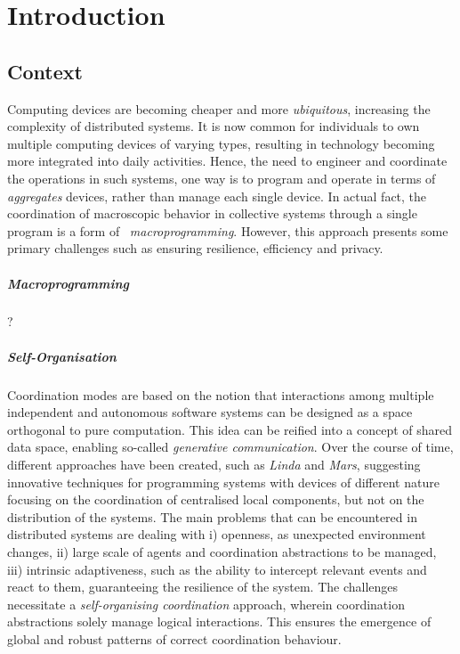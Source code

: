 
\chapter{Introduction}
\label{ch:introduction}
\section{Context}
\label{sec:context}

Computing devices are becoming cheaper and more \emph{ubiquitous}, increasing the complexity of distributed systems.
It is now common for individuals to own multiple computing devices of varying types,
resulting in technology becoming more integrated into daily activities.
Hence, the need to engineer and coordinate the operations in such systems, one way is to program and operate in terms of
    \emph{aggregates} devices, rather than manage each single device.
In actual fact, the coordination of macroscopic behavior in collective systems through a single program is a form of
~\emph{macroprogramming}.
However, this approach presents some primary challenges such as ensuring resilience, efficiency and privacy.

\paragraph{Macroprogramming}
?

\paragraph{Self-Organisation}
Coordination modes are based on the notion that interactions among multiple independent and autonomous software systems
can be designed as a space orthogonal to pure computation.
This idea can be reified into a concept of shared data space, enabling so-called \emph{generative communication}.
Over the course of time, different approaches have been created, such as \emph{Linda} and \emph{Mars},
suggesting innovative techniques for programming systems with devices of different nature focusing on the coordination
of centralised local components, but not on the distribution of the systems.
The main problems that can be encountered in distributed systems are dealing with
    i) openness, as unexpected environment changes,
    ii) large scale of agents and coordination abstractions to be managed,
    iii) intrinsic adaptiveness, such as the ability to intercept relevant events and react to them, guaranteeing
        the resilience of the system.
The challenges necessitate a \emph{self-organising coordination} approach, wherein coordination abstractions solely
manage logical interactions.
This ensures the emergence of global and robust patterns of correct coordination behaviour.


